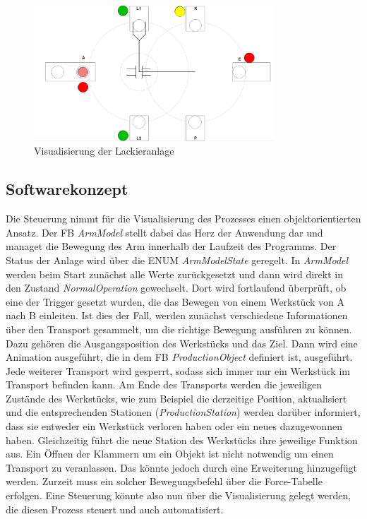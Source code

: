 \documentclass{report}
\begin{document}
\begin{figure}
  \centering
  \includegraphics[width=0.8\textwidth]{assets/img/visu_v1.png}
  \caption{Visualisierung der Lackieranlage}
  \label{fig:visu}
\end{figure}

\subsection{Softwarekonzept}

Die Steuerung nimmt für die Visualisierung des Prozesses einen objektorientierten Ansatz. Der FB \textit{ArmModel} stellt dabei das Herz der Anwendung dar und managet die Bewegung des Arm innerhalb der Laufzeit des Programms. Der Status der Anlage wird über die ENUM \textit{ArmModelState} geregelt. In \textit{ArmModel} werden beim Start zunächst alle Werte zurückgesetzt und dann wird direkt in den Zustand \textit{NormalOperation} gewechselt. Dort wird fortlaufend überprüft, ob eine der Trigger gesetzt wurden, die das Bewegen von einem Werkstück von A nach B einleiten. Ist dies der Fall, werden zunächst verschiedene Informationen über den Transport gesammelt, um die richtige Bewegung ausführen zu können. Dazu gehören die Ausgangsposition des Werkstücks und das Ziel. Dann wird eine Animation ausgeführt, die in dem FB \textit{ProductionObject} definiert ist, ausgeführt. Jede weiterer Transport wird gesperrt, sodass sich immer nur ein Werkstück im Transport befinden kann. Am Ende des Transports werden die jeweiligen Zustände des Werkstücks, wie zum Beispiel die derzeitige Position, aktualisiert und die entsprechenden Stationen (\textit{ProductionStation}) werden darüber informiert, dass sie entweder ein Werkstück verloren haben oder ein neues dazugewonnen haben. Gleichzeitig führt die neue Station des Werkstücks ihre jeweilige Funktion aus. Ein Öffnen der Klammern um ein Objekt ist nicht notwendig um einen Transport zu veranlassen. Das könnte jedoch durch eine Erweiterung hinzugefügt werden. Zurzeit muss ein solcher Bewegungsbefehl über die Force-Tabelle erfolgen. Eine Steuerung könnte also nun über die Visualisierung gelegt werden, die diesen Prozess steuert und auch automatisiert.
\end{document}
